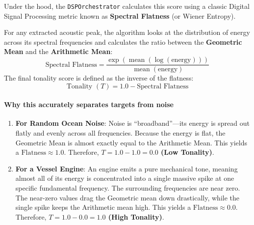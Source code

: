 \documentclass[12pt,a4paper]{article}
\begin{document}
Under the hood, the \texttt{DSPOrchestrator} calculates this score using a classic Digital Signal Processing metric known as \textbf{Spectral Flatness} (or Wiener Entropy). 

For any extracted acoustic peak, the algorithm looks at the distribution of energy across its spectral frequencies and calculates the ratio between the \textbf{Geometric Mean} and the \textbf{Arithmetic Mean}:
\begin{equation}
    \text{Spectral Flatness} = \frac{\exp\left( \operatorname{mean}\left( \log(\text{energy}) \right) \right)}{\operatorname{mean}(\text{energy})}
\end{equation}
The final tonality score is defined as the inverse of the flatness:
\begin{equation}
    \text{Tonality } (T) = 1.0 - \text{Spectral Flatness}
\end{equation}

\paragraph{Why this accurately separates targets from noise}
\begin{enumerate}
    \item \textbf{For Random Ocean Noise}: Noise is ``broadband''---its energy is spread out flatly and evenly across all frequencies. Because the energy is flat, the Geometric Mean is almost exactly equal to the Arithmetic Mean. This yields a $\text{Flatness} \approx 1.0$. Therefore, \textbf{$T = 1.0 - 1.0 = 0.0$ (Low Tonality)}.
    \item \textbf{For a Vessel Engine}: An engine emits a pure mechanical tone, meaning almost all of its energy is concentrated into a single massive spike at one specific fundamental frequency. The surrounding frequencies are near zero. The near-zero values drag the Geometric mean down drastically, while the single spike keeps the Arithmetic mean high. This yields a $\text{Flatness} \approx 0.0$. Therefore, \textbf{$T = 1.0 - 0.0 = 1.0$ (High Tonality)}.
\end{enumerate}
\end{document}
